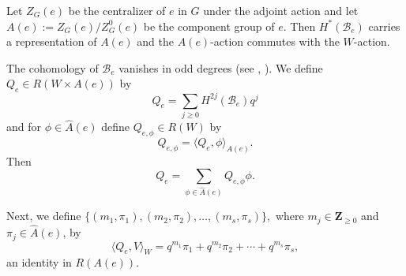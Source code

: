 \documentclass[10pt]{amsart}
\newcommand{\zz}{\mathbf Z}
\renewcommand{\wr}{\hat{W}}
\newcommand{\ar}{{\hat{A}}(e)}
\newcommand{\flag}{{\mathcal B}}
\theoremstyle{plain}
\theoremstyle{definition}
\theoremstyle{remark}
\begin{document}

Let $Z_G(e)$ be the centralizer of $e$ in $G$ under the adjoint action and let $A(e) := Z_G(e)/ Z^0_G(e)$ be the component group of $e$.
Then $H^*(\flag_e)$ carries a representation of $A(e)$ and the $A(e)$-action commutes with the $W$-action.

The cohomology of $\flag_e$ vanishes in odd degrees (see \cite{bs:green}, \cite{dlp}).  We define 
$Q_{e} \in R(W \times A(e))$ by
$$Q_{e} = \sum_{j \geq 0}  H^{2j}(\flag_e) q^j$$
and for $\phi \in \ar$ define $Q_{e, \phi} \in R(W)$ by 
$$Q_{e, \phi} =   \langle Q_e, \phi \rangle_{A(e)}.$$
Then
$$Q_e = \sum_{\phi \in \ar} Q_{e, \phi} \phi.$$ 

Next, we define %
$\{(m_1, \pi_1),  (m_2, \pi_2), \dots, (m_s, \pi_s)  \},$ where $m_j \in \zz_{\geq 0}$  and $\pi_j \in \ar$, by 
$$\langle Q_{e}, V \rangle_{W} = q^{m_1} \pi_1 + q^{m_2} \pi_2 + \cdots + q^{m_s} \pi_s,$$
an identity in $R(A(e))$.





\end{document}
